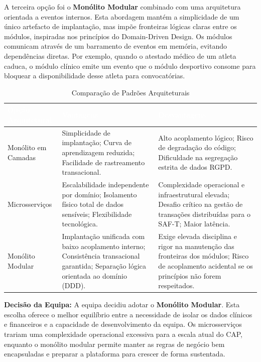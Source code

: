 \documentclass[a4paper,12pt]{scrreprt}
\begin{document}
{A terceira opção foi o \textbf{Monólito Modular} combinado com uma arquitetura orientada a eventos internos. Esta abordagem mantém a simplicidade de um único artefacto de implantação, mas impõe fronteiras lógicas claras entre os módulos, inspiradas nos princípios do Domain-Driven Design. Os módulos comunicam através de um barramento de eventos em memória, evitando dependências diretas. Por exemplo, quando o atestado médico de um atleta caduca, o módulo clínico emite um evento que o módulo desportivo consome para bloquear a disponibilidade desse atleta para convocatórias.

\begin{table}[h]
\centering
\begin{tabular}{|p{4cm}|p{5cm}|p{6cm}|}
\hline
\rowcolor{headerblue}\textcolor{white}{\textbf{Opção Arquitetural}} & \textcolor{white}{\textbf{Vantagens}} & \textcolor{white}{\textbf{Desvantagens}} \\ \hline
Monólito em Camadas & Simplicidade de implantação; Curva de aprendizagem reduzida; Facilidade de rastreamento transacional. & Alto acoplamento lógico; Risco de degradação do código; Dificuldade na segregação estrita de dados RGPD. \\ \hline
Microsserviços & Escalabilidade independente por domínio; Isolamento físico total de dados sensíveis; Flexibilidade tecnológica. & Complexidade operacional e infraestrutural elevada; Desafio crítico na gestão de transações distribuídas para o SAF-T; Maior latência. \\ \hline
Monólito Modular & Implantação unificada com baixo acoplamento interno; Consistência transacional garantida; Separação lógica orientada ao domínio (DDD). & Exige elevada disciplina e rigor na manutenção das fronteiras dos módulos; Risco de acoplamento acidental se os princípios não forem respeitados. \\ \hline
\end{tabular}
\caption{Comparação de Padrões Arquiteturais}
\end{table}

\textbf{Decisão da Equipa:} A equipa decidiu adotar o \textbf{Monólito Modular}. Esta escolha oferece o melhor equilíbrio entre a necessidade de isolar os dados clínicos e financeiros e a capacidade de desenvolvimento da equipa. Os microsserviços trariam uma complexidade operacional excessiva para a escala atual do CAP, enquanto o monólito modular permite manter as regras de negócio bem encapsuladas e preparar a plataforma para crescer de forma sustentada.



}
\end{document}
